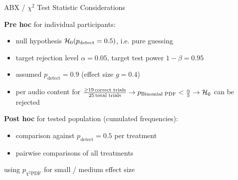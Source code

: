 \documentclass[mathserif]{intbeamer}
\begin{document}
\begin{frame}{ABX / $\chi^2$ Test Statistic Considerations}


\textbf{Pre hoc} for individual participants:
\begin{itemize}
\item
null hypothesis $\mathcal{H}_{0}(p_\text{detect}=0.5)$, i.e. pure guessing
\item
target rejection level $\alpha=0.05$,
target test power $1-\beta = 0.95$

\item
assumed $p_\text{detect}=0.9$ (effect size $g=0.4$)
\item
\textcolor{colnonzero}{per audio content}
for $\frac{\geq 19\,\text{correct trials}}{25\,\text{total trials}}
\rightarrow p_\text{Binomial PDF}<\frac{\alpha}{5} \rightarrow\mathcal{H}_{0}$
can be rejected
\end{itemize}
%
\vspace{0.25cm}

\textbf{Post hoc} for tested population (cumulated frequencies):

\begin{itemize}
\item comparison against $p_\text{detect}=0.5$ per treatment
\item pairwise comparisons of all treatments
\end{itemize}
using $p_{\chi^2 \text{PDF}}$ for small / medium effect size
\end{frame}
%
%
%
\end{document}
